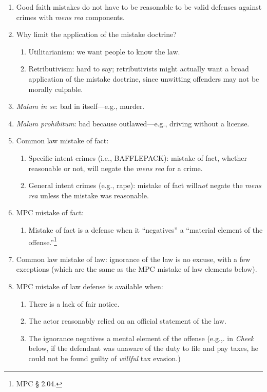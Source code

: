 \begin{enumerate}
    \item Good faith mistakes do not have to be reasonable to be valid defenses against crimes with \emph{mens rea} components.
    \item Why limit the application of the mistake doctrine?
    \begin{enumerate}
        \item Utilitarianism: we want people to know the law.
        \item Retributivism: hard to say; retributivists might actually want a broad application of the mistake doctrine, since unwitting offenders may not be morally culpable.
    \end{enumerate}
    \item \emph{Malum in se}: bad in itself---e.g., murder.
    \item \emph{Malum prohibitum}: bad because outlawed---e.g., driving without a license.
    \item Common law mistake of fact:
    \begin{enumerate}
        \item Specific intent crimes (i.e., BAFFLEPACK): mistake of fact, whether reasonable or not, will negate the \emph{mens rea} for a crime.
        \item General intent crimes (e.g., rape): mistake of fact will\emph{not} negate the \emph{mens rea} unless the mistake was reasonable.
    \end{enumerate}
    \item MPC mistake of fact:
    \begin{enumerate}
        \item Mistake of fact is a defense when it ``negatives'' a ``material element of the offense.''\footnote{MPC § 2.04.}
    \end{enumerate}
    \item Common law mistake of law: ignorance of the law is no excuse, with a few exceptions (which are the same as the MPC mistake of law elements below).
    \item MPC mistake of law defense is available when:
    \begin{enumerate}
        \item There is a lack of fair notice.
        \item The actor reasonably relied on an official statement of the law.
        \item The ignorance negatives a mental element of the offense (e.g.,. in \emph{Cheek} below, if the defendant was unaware of the duty to file and pay taxes, he could not be found guilty of \emph{willful} tax evasion.)
    \end{enumerate}
\end{enumerate}

